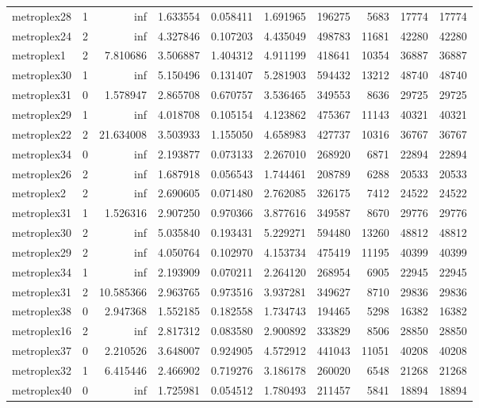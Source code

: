 \documentclass[../../../thesis.tex]{subfiles}
\begin{document}
\begin{longtable}{|l|r|r|r|r|r|r|r|r|r|}
metroplex28 & 1 & inf & 1.633554 & 0.058411 & 1.691965 & 196275 & 5683 & 17774 & 17774 \\
metroplex24 & 2 & inf & 4.327846 & 0.107203 & 4.435049 & 498783 & 11681 & 42280 & 42280 \\
metroplex1 & 2 & 7.810686 & 3.506887 & 1.404312 & 4.911199 & 418641 & 10354 & 36887 & 36887 \\
metroplex30 & 1 & inf & 5.150496 & 0.131407 & 5.281903 & 594432 & 13212 & 48740 & 48740 \\
metroplex31 & 0 & 1.578947 & 2.865708 & 0.670757 & 3.536465 & 349553 & 8636 & 29725 & 29725 \\
metroplex29 & 1 & inf & 4.018708 & 0.105154 & 4.123862 & 475367 & 11143 & 40321 & 40321 \\
metroplex22 & 2 & 21.634008 & 3.503933 & 1.155050 & 4.658983 & 427737 & 10316 & 36767 & 36767 \\
metroplex34 & 0 & inf & 2.193877 & 0.073133 & 2.267010 & 268920 & 6871 & 22894 & 22894 \\
metroplex26 & 2 & inf & 1.687918 & 0.056543 & 1.744461 & 208789 & 6288 & 20533 & 20533 \\
metroplex2 & 2 & inf & 2.690605 & 0.071480 & 2.762085 & 326175 & 7412 & 24522 & 24522 \\
metroplex31 & 1 & 1.526316 & 2.907250 & 0.970366 & 3.877616 & 349587 & 8670 & 29776 & 29776 \\
metroplex30 & 2 & inf & 5.035840 & 0.193431 & 5.229271 & 594480 & 13260 & 48812 & 48812 \\
metroplex29 & 2 & inf & 4.050764 & 0.102970 & 4.153734 & 475419 & 11195 & 40399 & 40399 \\
metroplex34 & 1 & inf & 2.193909 & 0.070211 & 2.264120 & 268954 & 6905 & 22945 & 22945 \\
metroplex31 & 2 & 10.585366 & 2.963765 & 0.973516 & 3.937281 & 349627 & 8710 & 29836 & 29836 \\
metroplex38 & 0 & 2.947368 & 1.552185 & 0.182558 & 1.734743 & 194465 & 5298 & 16382 & 16382 \\
metroplex16 & 2 & inf & 2.817312 & 0.083580 & 2.900892 & 333829 & 8506 & 28850 & 28850 \\
metroplex37 & 0 & 2.210526 & 3.648007 & 0.924905 & 4.572912 & 441043 & 11051 & 40208 & 40208 \\
metroplex32 & 1 & 6.415446 & 2.466902 & 0.719276 & 3.186178 & 260020 & 6548 & 21268 & 21268 \\
metroplex40 & 0 & inf & 1.725981 & 0.054512 & 1.780493 & 211457 & 5841 & 18894 & 18894 \\

\end{longtable}
\end{document}
